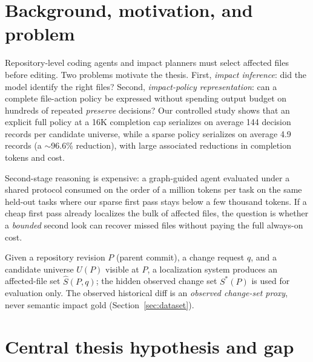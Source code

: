 \documentclass[11pt,a4paper]{article}
\begin{document}
\begin{abstract}
Status and scope boundaries are kept explicit: the fixed-budget result is
confirmed; adaptive budget allocation is a future development program (P2),
not a completed contribution; and generalization so far covers Python/Django
repositories, with cross-language evaluation deferred to future
external-validity work. One scope limitation applies throughout: localization
is evaluated against the observed historical diff as a proxy for impact,
never against semantic ground truth.
\end{abstract}

\section{Background, motivation, and problem}
\label{sec:background}

Repository-level coding agents and impact planners must select affected files
before editing. Two problems motivate the thesis. First, \emph{impact
inference}: did the model identify the right files? Second,
\emph{impact-policy representation}: can a complete file-action policy be
expressed without spending output budget on hundreds of repeated
\emph{preserve} decisions? Our controlled study shows that an explicit full
policy at a 16K completion cap serializes on average 144 decision records per
candidate universe, while a sparse policy serializes on average 4.9 records (a
$\sim$96.6\% reduction), with large associated reductions in completion tokens
and cost.

Second-stage reasoning is expensive: a graph-guided agent evaluated under a
shared protocol consumed on the order of a million tokens per task on the same
held-out tasks where our sparse first pass stays below a few thousand tokens.
If a cheap first pass already localizes the bulk of affected files, the
question is whether a \emph{bounded} second look can recover missed files
without paying the full always-on cost.

Given a repository revision $P$ (parent commit), a change request $q$, and a
candidate universe $U(P)$ visible at $P$, a localization system produces an
affected-file set $\hat{S}(P,q)$; the hidden observed change set $S^*(P)$ is
used for evaluation only. The observed historical diff is an \emph{observed
change-set proxy}, never semantic impact gold (Section~\ref{sec:dataset}).

\section{Central thesis hypothesis and gap}
\label{sec:hypothesis}
\end{document}
